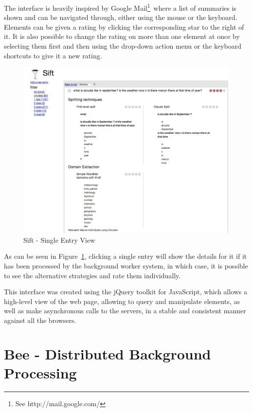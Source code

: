 The interface is heavily inspired by Google Mail\footnote{See http://mail.google.com/}\ where a list of summaries is shown and can be navigated through, either using the mouse or the keyboard. Elements can be given a rating by clicking the corresponding star to the right of it. It is also possible to change the rating on more than one element at once by selecting them first and then using the drop-down action menu or the keyboard shortcuts to give it a new rating.

\begin{figure}[ht!]
  \begin{center}
    \includegraphics[width=\linewidth]{images/siftentry}
  \end{center}
  \caption{Sift - Single Entry View}\label{fig:sift_entry}
\end{figure}


As can be seen in Figure~\ref{fig:sift_entry}, clicking a single entry will show the details for it if it has been processed by the background worker system, in which case, it is possible to see the alternative strategies and rate them individually.

This interface was created using the jQuery toolkit for JavaScript, which allows a high-level view of the web page, allowing to query and manipulate elements, as well as make asynchronous calls to the servers, in a stable and consistent manner against all the browsers.


\section{Bee - Distributed Background Processing} %
\label{sec:bee_distributed_background_processing}

